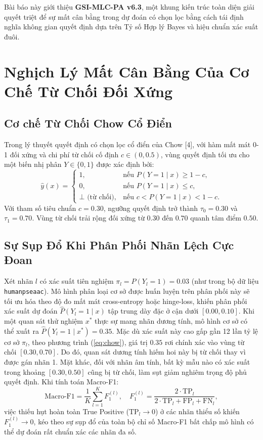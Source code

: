 \documentclass[10pt,a4paper,twoside]{article}
\begin{document}
Bài báo này giới thiệu \textbf{GSI-MLC-PA v6.3}, một khung kiến trúc toàn diện giải quyết triệt để sự mất cân bằng trong dự đoán có chọn lọc bằng cách tái định nghĩa không gian quyết định dựa trên Tỷ số Hợp lý Bayes và hiệu chuẩn xác suất đuôi.
\section{Nghịch Lý Mất Cân Bằng Của Cơ Chế Từ Chối Đối Xứng}
\subsection{Cơ chế Từ Chối Chow Cổ Điển}
Trong lý thuyết quyết định có chọn lọc cổ điển của Chow [4], với hàm mất mát 0-1 đối xứng và chi phí từ chối cố định $c \in (0, 0.5)$, vùng quyết định tối ưu cho một biến nhị phân $Y \in \{0, 1\}$ được xác định bởi:
\begin{equation}
\hat{y}(x) = \begin{cases}
1, & \text{nếu } P(Y=1 \mid x) \ge 1 - c, \\
0, & \text{nếu } P(Y=1 \mid x) \le c, \\
\bot \text{ (từ chối)}, & \text{nếu } c < P(Y=1 \mid x) < 1 - c.
\end{cases}
\label{eq:chow}
\end{equation}
Với tham số tiêu chuẩn $c = 0.30$, ngưỡng quyết định trở thành $\tau_0 = 0.30$ và $\tau_1 = 0.70$. Vùng từ chối trải rộng đối xứng từ $0.30$ đến $0.70$ quanh tâm điểm $0.50$.

\subsection{Sự Sụp Đổ Khi Phân Phối Nhãn Lệch Cực Đoan}
Xét nhãn $l$ có xác suất tiên nghiệm $\pi_l = P(Y_l = 1) = 0.03$ (như trong bộ dữ liệu \texttt{humanpseaac}). Mô hình phân loại cơ sở được huấn luyện trên phân phối này sẽ tối ưu hóa theo độ đo mất mát cross-entropy hoặc hinge-loss, khiến phân phối xác suất dự đoán $\hat{P}(Y_l=1 \mid x)$ tập trung dày đặc ở cận dưới $[0.00, 0.10]$. Khi một quan sát thử nghiệm $x^*$ thực sự mang nhãn dương tính, mô hình cơ sở có thể xuất ra $\hat{P}(Y_l=1 \mid x^*) = 0.35$. Mặc dù xác suất này cao gấp gần 12 lần tỷ lệ cơ sở $\pi_l$, theo phương trình (\ref{eq:chow}), giá trị $0.35$ rơi chính xác vào vùng từ chối $[0.30, 0.70]$. Do đó, quan sát dương tính hiếm hoi này bị từ chối thay vì được gán nhãn 1. Mặt khác, đối với nhãn âm tính, bất kỳ mẫu nào có xác suất trong khoảng $[0.30, 0.50]$ cũng bị từ chối, làm sụt giảm nghiêm trọng độ phủ quyết định. Khi tính toán Macro-F1:
\begin{equation}
\text{Macro-F1} = \frac{1}{K} \sum_{l=1}^K F_1^{(l)}, \quad F_1^{(l)} = \frac{2 \cdot \text{TP}_l}{2 \cdot \text{TP}_l + \text{FP}_l + \text{FN}_l},
\end{equation}
việc thiếu hụt hoàn toàn True Positive ($\text{TP}_l \to 0$) ở các nhãn thiểu số khiến $F_1^{(l)} \to 0$, kéo theo sự sụp đổ của toàn bộ chỉ số Macro-F1 bất chấp mô hình có thể dự đoán rất chuẩn xác các nhãn đa số.
\end{document}
